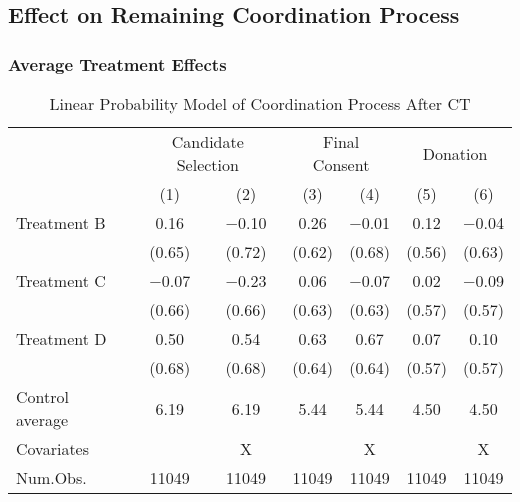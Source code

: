 \documentclass[12pt, a4paper]{article}
\begin{document}
\hypertarget{effect-on-remaining-coordination-process}{%
\subsection{Effect on Remaining Coordination Process}\label{effect-on-remaining-coordination-process}}

\hypertarget{average-treatment-effects-1}{%
\subsubsection{Average Treatment Effects}\label{average-treatment-effects-1}}

\begin{table}[H]

\caption{\label{tab:lm-coordinate}Linear Probability Model of Coordination Process After CT}
\centering
\fontsize{8}{10}\selectfont
\begin{threeparttable}
\begin{tabular}[t]{lcccccc}
\toprule
\multicolumn{1}{c}{ } & \multicolumn{2}{c}{Candidate Selection} & \multicolumn{2}{c}{Final Consent} & \multicolumn{2}{c}{Donation} \\
\cmidrule(l{3pt}r{3pt}){2-3} \cmidrule(l{3pt}r{3pt}){4-5} \cmidrule(l{3pt}r{3pt}){6-7}
  & (1) & (2) & (3) & (4) & (5) & (6)\\
\midrule
Treatment B & \num{0.16} & \num{-0.10} & \num{0.26} & \num{-0.01} & \num{0.12} & \num{-0.04}\\
 & (\num{0.65}) & (\num{0.72}) & (\num{0.62}) & (\num{0.68}) & (\num{0.56}) & (\num{0.63})\\
Treatment C & \num{-0.07} & \num{-0.23} & \num{0.06} & \num{-0.07} & \num{0.02} & \num{-0.09}\\
 & (\num{0.66}) & (\num{0.66}) & (\num{0.63}) & (\num{0.63}) & (\num{0.57}) & (\num{0.57})\\
Treatment D & \num{0.50} & \num{0.54} & \num{0.63} & \num{0.67} & \num{0.07} & \num{0.10}\\
 & (\num{0.68}) & (\num{0.68}) & (\num{0.64}) & (\num{0.64}) & (\num{0.57}) & (\num{0.57})\\
\midrule
Control average & 6.19 & 6.19 & 5.44 & 5.44 & 4.50 & 4.50\\
Covariates &  & X &  & X &  & X\\
Num.Obs. & \num{11049} & \num{11049} & \num{11049} & \num{11049} & \num{11049} & \num{11049}\\
\bottomrule
\end{tabular}
\begin{tablenotes}

\end{tablenotes}
\end{threeparttable}
\end{table}
\end{document}
